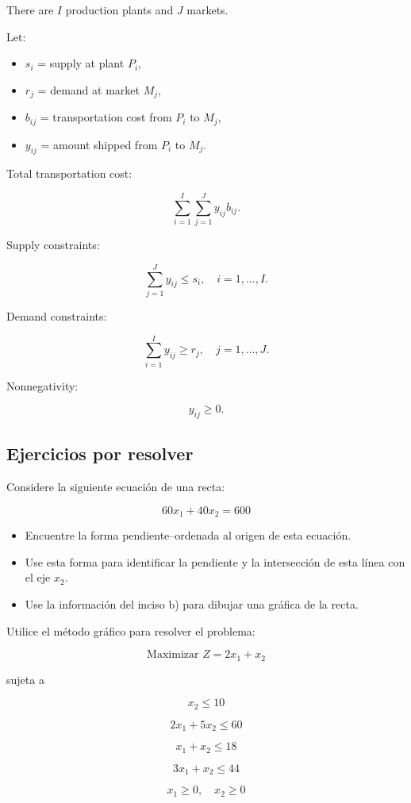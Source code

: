 \begin{Ejem}

There are $I$ production plants and $J$ markets.

Let:
\begin{itemize}
\item $s_i$ = supply at plant $P_i$,
\item $r_j$ = demand at market $M_j$,
\item $b_{ij}$ = transportation cost from $P_i$ to $M_j$,
\item $y_{ij}$ = amount shipped from $P_i$ to $M_j$.
\end{itemize}

Total transportation cost:

\[
\sum_{i=1}^{I} \sum_{j=1}^{J} y_{ij} b_{ij}.
\tag{4}
\]

Supply constraints:

\[
\sum_{j=1}^{J} y_{ij} \le s_i,
\quad i=1,\dots,I.
\tag{5}
\]

Demand constraints:

\[
\sum_{i=1}^{I} y_{ij} \ge r_j,
\quad j=1,\dots,J.
\tag{6}
\]

Nonnegativity:

\[
y_{ij} \ge 0.
\tag{7}
\]
\end{Ejem}

\subsection{Ejercicios por resolver}

\begin{Ejer}
Considere la siguiente ecuaci\'on de una recta:

\[
60x_1 + 40x_2 = 600
\]

\begin{itemize}
\item[a)] Encuentre la forma pendiente–ordenada al origen de esta ecuaci\'on.
\item[b)] Use esta forma para identificar la pendiente y la intersecci\'on de esta l\'inea con el eje $x_2$.
\item[c)] Use la informaci\'on del inciso b) para dibujar una gr\'afica de la recta.
\end{itemize}

\end{Ejer}


\begin{Ejer}
Utilice el m\'etodo gr\'afico para resolver el problema:

\[
\text{Maximizar } Z = 2x_1 + x_2
\]

sujeta a

\[
x_2 \le 10
\]

\[
2x_1 + 5x_2 \le 60
\]

\[
x_1 + x_2 \le 18
\]

\[
3x_1 + x_2 \le 44
\]

\[
x_1 \ge 0,\quad x_2 \ge 0
\]

\end{Ejer}


